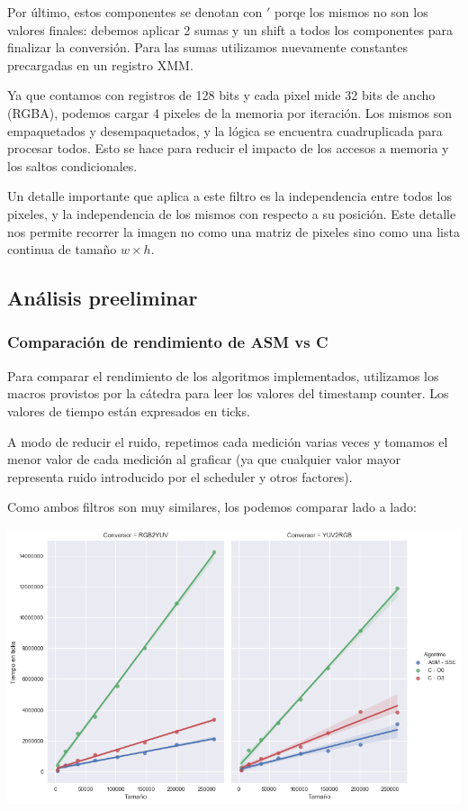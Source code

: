 Por último, estos componentes se denotan con $'$ porqe los mismos no son los valores finales: debemos aplicar 2 sumas y un shift a todos los componentes para finalizar la conversión. Para las sumas utilizamos nuevamente constantes precargadas en un registro XMM.

Ya que contamos con registros de 128 bits y cada pixel mide 32 bits de ancho (RGBA), podemos cargar 4 pixeles de la memoria por iteración. Los mismos son empaquetados y desempaquetados, y la lógica se encuentra cuadruplicada para procesar todos. Esto se hace para reducir el impacto de los accesos a memoria y los saltos condicionales.

Un detalle importante que aplica a este filtro es la independencia entre todos los pixeles, y la independencia de los mismos con respecto a su posición. Este detalle nos permite recorrer la imagen no como una matriz de pixeles sino como una lista continua de tamaño $w \times h$.


\subsection{Análisis preeliminar}
\subsubsection*{Comparación de rendimiento de ASM vs C}

Para comparar el rendimiento de los algoritmos implementados, utilizamos los macros provistos por la cátedra para leer los valores del timestamp counter. Los valores de tiempo están expresados en ticks.

A modo de reducir el ruido, repetimos cada medición varias veces y tomamos el menor valor de cada medición al graficar (ya que cualquier valor mayor representa ruido introducido por el scheduler y otros factores).

Como ambos filtros son muy similares, los podemos comparar lado a lado:

\begin{center}
	\includegraphics[scale=0.5]{img/conversores_CvsASMvsO3.png}
\end{center}

